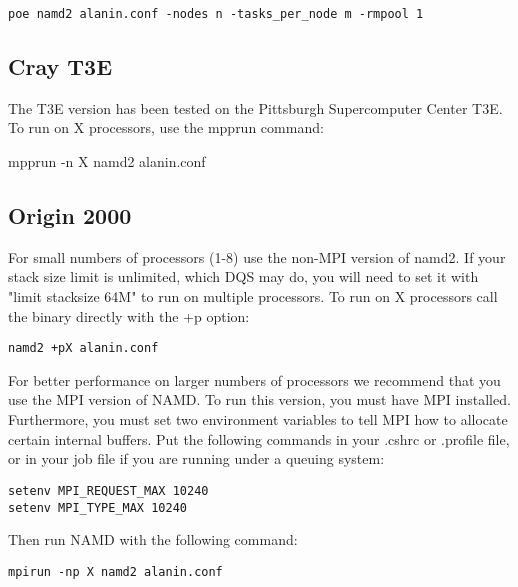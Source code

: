 \begin{verbatim}
poe namd2 alanin.conf -nodes n -tasks_per_node m -rmpool 1
\end{verbatim}

\subsection{Cray T3E}

The T3E version has been tested on the Pittsburgh Supercomputer Center
T3E.  To run on X processors, use the mpprun command:

mpprun -n X namd2 alanin.conf

\subsection{Origin 2000}

For small numbers of processors (1-8) use the non-MPI version of namd2.
If your stack size limit is unlimited, which DQS may do, you will need
to set it with "limit stacksize 64M" to run on multiple processors.
To run on X processors call the binary directly with the +p option:

\begin{verbatim}
namd2 +pX alanin.conf
\end{verbatim}

For better performance on larger numbers of processors we recommend
that you use the MPI version of NAMD.  To run this version, you must
have MPI installed.  Furthermore, you must set two environment
variables to tell MPI how to allocate certain internal buffers.  Put
the following commands in your .cshrc or .profile file, or in your
job file if you are running under a queuing system:

\begin{verbatim}
setenv MPI_REQUEST_MAX 10240
setenv MPI_TYPE_MAX 10240
\end{verbatim}

Then run NAMD with the following command:

\begin{verbatim}
mpirun -np X namd2 alanin.conf
\end{verbatim}



